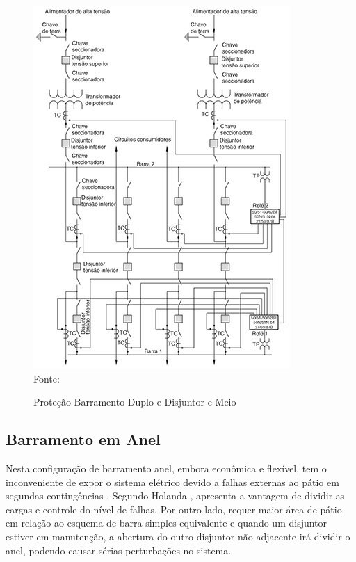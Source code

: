 \begin{figure}[!htb] 
    \centering
    \caption{Proteção Barramento Duplo e Disjuntor e Meio}
    \includegraphics[scale = 1]{figuras/BarraDijuntorMeio.png}
    \\ Fonte: \cite{mamede2000protecao}
    \label{fig:BarraDijuntorMeio}
\end{figure}


\newpage

\subsection{Barramento em Anel}

Nesta configuração de barramento anel, embora econômica e flexível, tem o inconveniente de expor o sistema elétrico devido a falhas externas ao pátio em segundas contingências \cite{frontin2013equipamentos}. Segundo Holanda \citeyearpar{holanda2016suel}, apresenta a vantagem de dividir as cargas e controle do nível de falhas. Por outro lado, requer maior área de pátio em relação ao esquema de barra simples equivalente e quando um disjuntor estiver em manutenção, a abertura do outro
disjuntor não adjacente irá dividir o anel, podendo causar sérias perturbações no sistema.


